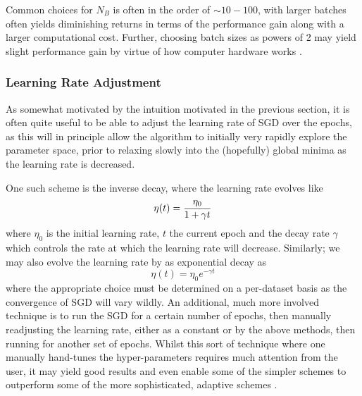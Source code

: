 \documentclass[reprint, english, nofootinbib]{revtex4-2}
\begin{document}
Common choices for $N_B$ is often in the order of $\sim 10-100$, with larger batches often yields diminishing returns in terms of the performance gain along with a larger computational cost. Further, choosing batch sizes as powers of 2 may yield slight performance gain by virtue of how computer hardware works \cite{Aggarwall}.

\subsubsection{Learning Rate Adjustment}
\noindent
As somewhat motivated by the intuition motivated in the previous section, it is often quite useful to be able to adjust the learning rate of SGD over the epochs, as this will in principle allow the algorithm to initially very rapidly explore the parameter space, prior to relaxing slowly into the (hopefully) global minima as the learning rate is decreased.

One such scheme is the inverse decay, where the learning rate evolves like
\begin{equation}
    \eta\qty(t) = \frac{\eta_0}{1 + \gamma t}
\end{equation}
where $\eta_0$ is the initial learning rate, $t$ the current epoch and the decay rate $\gamma$ which controls the rate at which the learning rate will decrease. Similarly; we may also evolve the learning rate by as exponential decay as
\begin{equation}
    \eta(t) = \eta_0 e^{-\gamma t}
\end{equation}
where the appropriate choice must be determined on a per-dataset basis as the convergence of SGD will vary wildly. An additional, much more involved technique is to run the SGD for a certain number of epochs, then manually readjusting the learning rate, either as a constant or by the above methods, then running for another set of epochs. Whilst this sort of technique where one manually hand-tunes the hyper-parameters requires much attention from the user, it may yield good results and even enable some of the simpler schemes to outperform some of the more sophisticated, adaptive schemes \cite{zhang2018yellowfin}.
\end{document}
